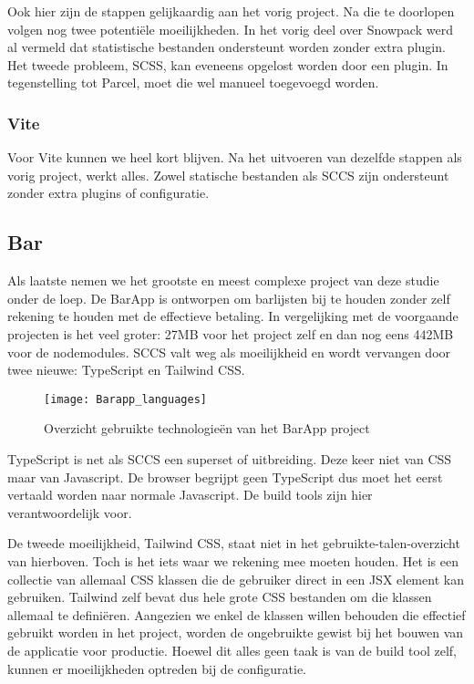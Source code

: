 Ook hier zijn de stappen gelijkaardig aan het vorig project. Na die te doorlopen volgen nog twee potentiële moeilijkheden. In het vorig deel over Snowpack werd al vermeld dat statistische bestanden ondersteunt worden zonder extra plugin. Het tweede probleem, SCSS, kan eveneens opgelost worden door een plugin. In tegenstelling tot Parcel, moet die wel manueel toegevoegd worden. 

\subsubsection{Vite}

Voor Vite kunnen we heel kort blijven. Na het uitvoeren van dezelfde stappen als vorig project, werkt alles. Zowel statische bestanden als SCCS zijn ondersteunt zonder extra plugins of configuratie.

\subsection{Bar}
Als laatste nemen we het grootste en meest complexe project van deze studie onder de loep. De BarApp \autocite{vansteenkiste-2021} is ontworpen om barlijsten bij te houden zonder zelf rekening te houden met de effectieve betaling. In vergelijking met de voorgaande projecten is het veel groter: 27MB voor het project zelf en dan nog eens 442MB voor de nodemodules. SCCS valt weg als moeilijkheid en wordt vervangen door twee nieuwe: TypeScript en Tailwind CSS.

\begin{figure}[h]
    \texttt{[image: Barapp\_languages]}
        \centering
        \caption{Overzicht gebruikte technologieën van het BarApp project}
    \end{figure}

    TypeScript is net als SCCS een superset of uitbreiding. Deze keer niet van CSS maar van Javascript. De browser begrijpt geen TypeScript dus moet het eerst vertaald worden naar normale Javascript. De build tools zijn hier verantwoordelijk voor.

    De tweede moeilijkheid, Tailwind CSS, staat niet in het gebruikte-talen-overzicht van hierboven. Toch is het iets waar we rekening mee moeten houden. Het is een collectie van allemaal CSS klassen die de gebruiker direct in een JSX element kan gebruiken. Tailwind zelf bevat dus hele grote CSS bestanden om die klassen allemaal te definiëren. Aangezien we enkel de klassen willen behouden die effectief gebruikt worden in het project, worden de ongebruikte gewist bij het bouwen van de applicatie voor productie. Hoewel dit alles geen taak is van de build tool zelf, kunnen er moeilijkheden optreden bij de configuratie.
    
